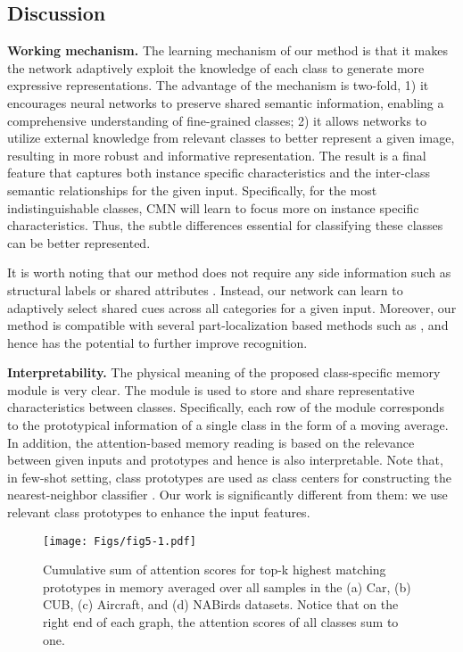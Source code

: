 \documentclass[journal]{IEEEtran}
\begin{document}
\subsection{Discussion}
\textbf{Working mechanism.} The learning mechanism of our method is that it makes the network adaptively exploit the knowledge of each class to generate more expressive representations. The advantage of the mechanism is two-fold, 1) it encourages neural networks to preserve shared semantic information, enabling a comprehensive understanding of fine-grained classes; 2) it allows networks to utilize external knowledge from relevant classes to better represent a given image, resulting in more robust and informative representation. The result is a final feature that captures both instance specific characteristics and the inter-class semantic relationships for the given input. Specifically, for the most indistinguishable classes, CMN will learn to focus more on instance specific characteristics. Thus, the subtle differences essential for classifying these classes can be better represented. 

It is worth noting that our method does not require any side information such as structural labels \cite{xie2015hyper,wang2015multiple} or shared attributes \cite{zhou2016fine}.
Instead, our network can learn to adaptively select shared cues across all categories for a given input. Moreover, our method is compatible with several part-localization based methods such as  \cite{zheng2019looking,recasens2018learning}, and hence has the potential to further improve recognition. 

\textbf{Interpretability.} The physical meaning of the proposed class-specific memory module is very clear. The module is used to store and share representative characteristics between classes. Specifically, each row of the module corresponds to the prototypical information of a single class in the form of a moving average.
In addition, the attention-based memory reading is based on the relevance between given inputs and prototypes and hence is also interpretable. 
Note that, in few-shot setting, class prototypes are used as class centers for constructing the nearest-neighbor classifier \cite{hsu2018unsupervised,snell2017prototypical,wertheimer2019few}. Our work is significantly different from them: we use relevant class prototypes to enhance the input features.

\begin{figure}[t]
\begin{center}
\texttt{[image: Figs/fig5-1.pdf]}
\end{center}
\caption{Cumulative sum of attention scores for top-k highest matching prototypes in memory averaged over all samples in the (a) Car, (b) CUB, (c) Aircraft, and (d) NABirds datasets. Notice that on the right end of each graph, the attention scores of all classes sum to one.}
\label{fig7}
\end{figure}
\end{document}
